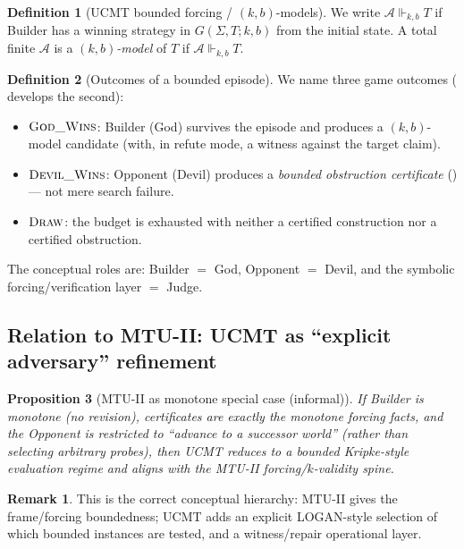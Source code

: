 \documentclass[11pt]{article}
\theoremstyle{definition}
\newtheorem{definition}{Definition}[section]
\newtheorem{remark}{Remark}[section]
\theoremstyle{plain}
\newtheorem{proposition}[definition]{Proposition}
\newcommand{\Sig}{\Sigma}
\newcommand{\Thy}{T}
\newcommand{\Struct}{\mathcal{A}}
\newcommand{\kbforces}{\Vdash_{k,b}}      %
\begin{document}
\begin{definition}[UCMT bounded forcing / $(k,b)$-models]
We write $\Struct \kbforces \Thy$ if Builder has a winning strategy in $G(\Sig,\Thy;k,b)$ from the initial state.
A total finite $\Struct$ is a \emph{$(k,b)$-model} of $\Thy$ if $\Struct\kbforces \Thy$.
\end{definition}

\begin{definition}[Outcomes of a bounded episode]\label{def:outcomes}
We name three game outcomes ( develops the second):
\begin{itemize}[leftmargin=1.5em]
\item $\textsc{God\_Wins}$: Builder (God) survives the episode and produces a $(k,b)$-model candidate (with, in refute mode, a witness against the target claim).
\item $\textsc{Devil\_Wins}$: Opponent (Devil) produces a \emph{bounded obstruction certificate} () --- not mere search failure.
\item $\textsc{Draw}$: the budget is exhausted with neither a certified construction nor a certified obstruction.
\end{itemize}
The conceptual roles are: Builder $=$ God, Opponent $=$ Devil, and the symbolic forcing/verification layer $=$ Judge.
\end{definition}

\subsection{Relation to MTU-II: UCMT as ``explicit adversary'' refinement}

\begin{proposition}[MTU-II as monotone special case (informal)]
If Builder is monotone (no revision), certificates are exactly the monotone forcing facts, and the Opponent is restricted
to ``advance to a successor world'' (rather than selecting arbitrary probes), then UCMT reduces to a bounded Kripke-style
evaluation regime and aligns with the MTU-II forcing/$k$-validity spine.
\end{proposition}

\begin{remark}
This is the correct conceptual hierarchy: MTU-II gives the frame/forcing boundedness; UCMT adds an explicit
LOGAN-style selection of which bounded instances are tested, and a witness/repair operational layer.
\end{remark}
\end{document}
